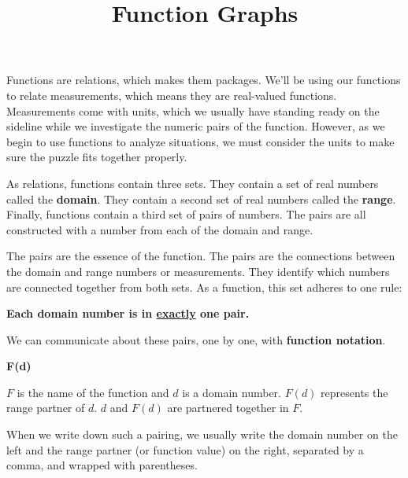 \documentclass{ximera}
\title{Function Graphs}
\begin{document}
\begin{abstract}

\end{abstract}
\maketitle


Functions are relations, which makes them packages.  We'll be using our functions to relate measurements, which means they are real-valued functions. Measurements come with units, which we usually have standing ready on the sideline while we investigate the numeric pairs of the function. However, as we begin to use functions to analyze situations, we must consider the units to make sure the puzzle fits together properly.



As relations, functions contain three sets.  They contain a set of real numbers called the \textbf{domain}.  They contain a second set of real numbers called the \textbf{range}. Finally, functions contain a third set of pairs of numbers.  The pairs are all constructed with a number from each of the domain and range.

The pairs are the essence of the function.  The pairs are the connections between the domain and range numbers or measurements.  They identify which numbers are connected together from both sets. As a function, this set adheres to one rule:


\begin{center}
  \textbf{\textcolor{red!90!darkgray}{Each domain number is in \underline{exactly} one pair.}}
\end{center}



We can communicate about these pairs, one by one, with \textbf{function notation}.



\begin{center}
\textbf{\textcolor{purple!85!blue}{F(d)}}
\end{center}



$F$ is the name of the function and $d$ is a domain number.  $F(d)$ represents the range partner of $d$.  $d$ and $F(d)$ are partnered together in $F$.

When we write down such a pairing, we usually write the domain number on the left and the range partner (or function value) on the right, separated by a comma, and wrapped with parentheses.
\end{document}
